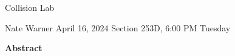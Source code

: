 \documentclass{report}
\title{\Huge{}}
\author{\huge{Nathan Warner}}
\date{\huge{}}
\begin{document}
    \begin{center}
        \begin{Huge}
            Collision Lab
        \end{Huge}
        \begin{Large}
            \bigbreak \noindent 
            Nate Warner
            \smallbreak \noindent
            April 16, 2024
            \bigbreak \noindent 
            Section 253D, 6:00 PM Tuesday 
        \end{Large}
    \end{center}
    \pagebreak 
    \tableofcontents
    \pagebreak \bigbreak \noindent 
    \begin{center}
    \textbf{Abstract}
    \end{center}
    \begin{adjustwidth}{.3in}{.3in}
        \hspace{\parindent} 
    \end{adjustwidth}

    \bigbreak \noindent 
\end{document}
